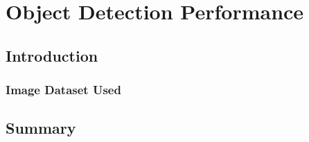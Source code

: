 \chapter{Object Detection Performance}

\section{Introduction}


\subsection{Image Dataset Used}\label{ch:dataset}



\section{Summary}
